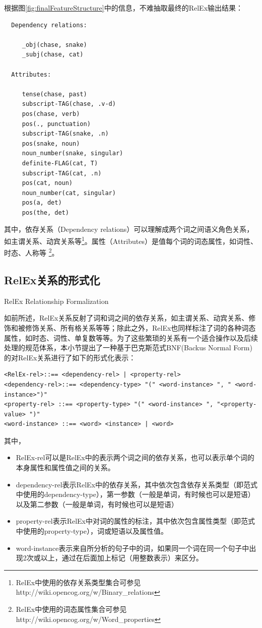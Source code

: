 根据图\ref{fig:finalFeatureStructure}中的信息，不难抽取最终的RelEx输出结果：

 \begin{verbatim}
  Dependency relations:

     _obj(chase, snake)
     _subj(chase, cat)

  Attributes:

     tense(chase, past)
     subscript-TAG(chase, .v-d)
     pos(chase, verb)
     pos(., punctuation)
     subscript-TAG(snake, .n)
     pos(snake, noun)
     noun_number(snake, singular)
     definite-FLAG(cat, T)
     subscript-TAG(cat, .n)
     pos(cat, noun)
     noun_number(cat, singular)
     pos(a, det)
     pos(the, det)
\end{verbatim}

其中，依存关系（Dependency relations）可以理解成两个词之间语义角色关系，如主谓关系、动宾关系等\footnote{RelEx中使用的依存关系类型集合可参见 http://wiki.opencog.org/w/Binary_relations}。属性（Attributes）是值每个词的词态属性，如词性、时态、人称等 \footnote{RelEx中使用的词态属性集合可参见http://wiki.opencog.org/w/Word_properties }。


\subsection{RelEx关系的形式化}{RelEx Relationship Formalization}


如前所述，RelEx关系反射了词和词之间的依存关系，如主谓关系、动宾关系、修饰和被修饰关系、所有格关系等等；除此之外，RelEx也同样标注了词的各种词态属性，如时态、词性、单复数等等。为了这些繁琐的关系有一个适合操作以及后续处理的规范体系，本小节提出了一种基于巴克斯范式BNF(Backus Normal Form)的对RelEx关系进行了如下的形式化表示：

 {\tt\begin{scriptsize}\begin{lstlisting}
<RelEx-rel>::== <dependency-rel> | <property-rel>
<dependency-rel>::== <dependency-type> "(" <word-instance> ", " <word-instance>")"
<property-rel> ::== <property-type> "(" <word-instance> ", "<property-value> ")"
<word-instance> ::== <word> <instance> | <word>
  \end{lstlisting}\end{scriptsize}}

其中，

\begin{itemize}
\item RelEx-rel可以是RelEx中的表示两个词之间的依存关系，也可以表示单个词的本身属性和属性值之间的关系。
\item dependency-rel表示RelEx中的依存关系，其中依次包含依存关系类型（即范式中使用的dependency-type），第一参数（一般是单词，有时候也可以是短语）以及第二参数（一般是单词，有时候也可以是短语）
\item property-rel表示RelEx中对词的属性的标注，其中依次包含属性类型（即范式中使用的property-type），词或短语以及属性值。
\item word-instance表示来自所分析的句子中的词，如果同一个词在同一个句子中出现2次或以上，通过在后面加上标记（用整数表示）来区分。
\end{itemize}

